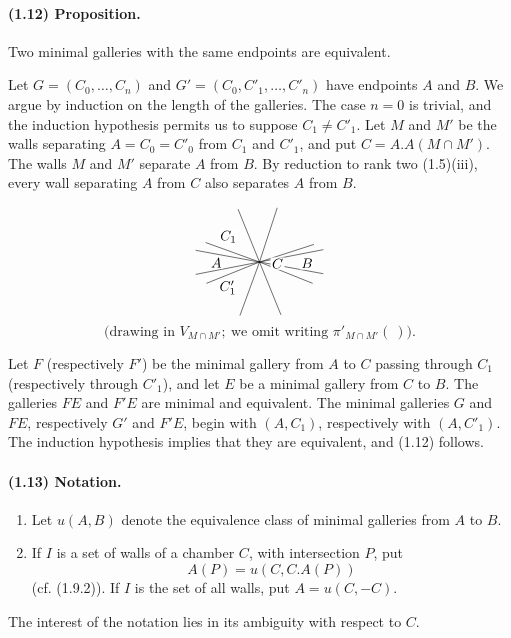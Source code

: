 \documentclass[10pt]{article}
\begin{document}
\paragraph{(1.12) Proposition.} Two minimal galleries with the same endpoints are equivalent.

Let $G=(C_0,\ldots,C_n)$ and $G'=(C_0,C'_1,\ldots,C'_n)$ have endpoints $A$ and $B$. We argue by induction on the length of the galleries. The case $n=0$ is trivial, and the induction hypothesis permits us to suppose $C_1\ne C'_1$. Let $M$ and $M'$ be the walls separating $A=C_0=C'_0$ from $C_1$ and $C'_1$, and put $C=A.A(M\cap M')$. The walls $M$ and $M'$ separate $A$ from $B$. By reduction to rank two (1.5)(iii), every wall separating $A$ from $C$ also separates $A$ from $B$.

\[
\begin{tikzpicture}[scale=0.82,baseline={(0,0)}]
\coordinate (O) at (0,0);
\foreach \a in {18,72,112,160,202,250,292,338}
  {\draw ({1.75*cos(\a)},{1.75*sin(\a)})--(O);}
\draw (-1.95,-0.38)--(1.95,0.38);
\draw (-1.95,0.36)--(1.95,-0.36);
\node[fill=white,inner sep=1pt] at (-0.95,0.78) {$C_1$};
\node[fill=white,inner sep=1pt] at (-1.32,-0.02) {$A$};
\node[fill=white,inner sep=1pt] at (0.55,-0.05) {$C$};
\node[fill=white,inner sep=1pt] at (1.45,-0.04) {$B$};
\node[fill=white,inner sep=1pt] at (-0.97,-0.78) {$C'_1$};
\end{tikzpicture}
\]
\[
\text{(drawing in }V_{M\cap M'};\ \text{we omit writing }\pi'_{M\cap M'}(\ )\text{).}
\]


Let $F$ (respectively $F'$) be the minimal gallery from $A$ to $C$ passing through $C_1$ (respectively through $C'_1$), and let $E$ be a minimal gallery from $C$ to $B$. The galleries $FE$ and $F'E$ are minimal and equivalent. The minimal galleries $G$ and $FE$, respectively $G'$ and $F'E$, begin with $(A,C_1)$, respectively with $(A,C'_1)$. The induction hypothesis implies that they are equivalent, and (1.12) follows.

\paragraph{(1.13) Notation.} \begin{enumerate}[label=(\roman*)]
\item Let $u(A,B)$ denote the equivalence class of minimal galleries from $A$ to $B$.
\item If $I$ is a set of walls of a chamber $C$, with intersection $P$, put
\[
A(P)=u(C,C.A(P))
\]
(cf. (1.9.2)). If $I$ is the set of all walls, put $A=u(C,-C)$.
\end{enumerate}
The interest of the notation lies in its ambiguity with respect to $C$.
\end{document}
